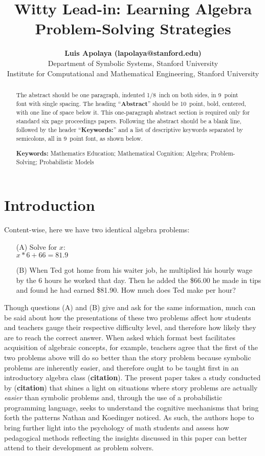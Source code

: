 \documentclass[10pt,letterpaper]{article}
\title{Witty Lead-in: Learning Algebra Problem-Solving Strategies}
\author{{\large \bf Luis Apolaya (lapolaya@stanford.edu)} \\
  Department of Symbolic Systems, Stanford University
  \AND {\large \bf Amy Shoemaker (amyshoe@stanford.edu)} \\
  Institute for Computational and Mathematical Engineering, Stanford University}
\begin{document}
\maketitle


\begin{abstract}
The abstract should be one paragraph, indented 1/8~inch on both sides,
in 9~point font with single spacing. The heading ``{\bf Abstract}''
should be 10~point, bold, centered, with one line of space below
it. This one-paragraph abstract section is required only for standard
six page proceedings papers. Following the abstract should be a blank
line, followed by the header ``{\bf Keywords:}'' and a list of
descriptive keywords separated by semicolons, all in 9~point font, as
shown below.

\textbf{Keywords:} 
Mathematics Education; Mathematical Cognition; Algebra; Problem-Solving; Probabilistic Models
\end{abstract}


\section{Introduction}

Content-wise, here we have two identical algebra problems:

\begin{enumerate}
\item[(A)] Solve for $x$:\\ $x * 6 + 66 = 81.9$

\item[(B)] When Ted got home from his waiter job, he multiplied his hourly wage by the 6 hours he worked that day. Then he added the \$66.00 he made in tips and found he had earned \$81.90. How much does Ted make per hour?
\end{enumerate}

Though questions (A) and (B) give and ask for the same information, much can be said about how the presentations of these two problems affect how students and teachers gauge their respective difficulty level, and therefore how likely they are to reach the correct answer. When asked which format best facilitates acquisition of algebraic concepts, for example, teachers agree that the first of the two problems above will do so better than the story problem because symbolic problems are inherently easier, and therefore ought to be taught first in an introductory algebra class (\textbf{citation}). The present paper takes a study conducted by (\textbf{citation}) that shines a light on situations where story problems are actually \textit{easier} than symbolic problems and, through the use of a probabilistic programming language, seeks to understand the cognitive mechanisms that bring forth the patterns Nathan and Koedinger noticed. As such, the authors hope to bring further light into the psychology of math students and assess how pedagogical methods reflecting the insights discussed in this paper can better attend to their development as problem solvers.
\end{document}
